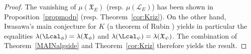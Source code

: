 \begin{proof}
The vanishing of $\mu(\mathfrak{X}_E)$ (resp. $\mu(\mathcal{L}_E)$) has been shown in Proposition~\ref{propmodp} (resp. Theorem~\ref{cor:Kriz}). On the other hand,
Iwasawa's main conjecture for $K$ (a theorem of Rubin \cite{rubinmainconj}) yields in particular the equalities
$\lambda(\Lcal_\phi)=\lambda(\mathfrak{X}_\phi)$ and
$\lambda(\Lcal_\psi)=\lambda(\mathfrak{X}_\psi)$. The combination of Theorem~\ref{MAINalgside} and Theorem~\ref{cor:Kriz} therefore yields the result.
\end{proof}
